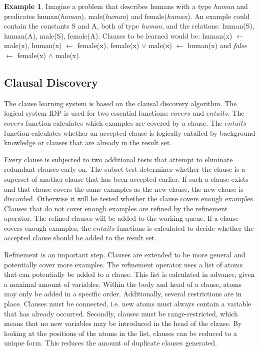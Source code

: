 \documentclass[letterpaper]{article}
\theoremstyle{definition}
\newtheorem{example}{Example}
\begin{document}
\begin{example}
  Imagine a problem that describes humans with a type \textit{human} and predicates human(\textit{human}), male(\textit{human}) and female(\textit{human}).
  An example could contain the constants S and A, both of type \textit{human}, and the relations: human(S), human(A), male(S), female(A).
  Clauses to be learned would be: human(x) $\leftarrow$ male(x), human(x) $\leftarrow$ female(x),  female(x) $\lor$ male(x) $\leftarrow$ human(x) and \textit{false} $\leftarrow$ female(x) $\land$ male(x).
\end{example}
\subsection{Clausal Discovery}
The clause learning system is based on the clausal discovery algorithm.
The logical system IDP is used for two essential functions: $\mathit{covers}$ and $\mathit{entails}$.
The $\mathit{covers}$ function calculates which examples are covered by a clause.
The $\mathit{entails}$ function calculates whether an accepted clause is logically entailed by background knowledge or clauses that are already in the result set.

Every clause is subjected to two additional tests that attempt to eliminate redundant clauses early on.
The subset-test determines whether the clause is a superset of another clause that has been accepted earlier.
If such a clause exists and that clause covers the same examples as the new clause, the new clause is discarded.
Otherwise it will be tested whether the clause covers enough examples.
Clauses that do not cover enough examples are refined by the refinement operator.
The refined clauses will be added to the working queue.
If a clause covers enough examples, the $\mathit{entails}$ functions is calculated to decide whether the accepted clause should be added to the result set.

Refinement is an important step.
Clauses are extended to be more general and potentially cover more examples.
The refinement operator uses a list of atoms that can potentially be added to a clause.
This list is calculated in advance, given a maximal amount of variables.
Within the body and head of a clause, atoms may only be added in a specific order.
Additionally, several restrictions are in place.
Clauses must be connected, i.e. new atoms must always contain a variable that has already occurred.
Secondly, clauses must be range-restricted, which means that no new variables may be introduced in the head of the clause.
By looking at the positions of the atoms in the list, clauses can be reduced to a unique form.
This reduces the amount of duplicate clauses generated.
\end{document}
